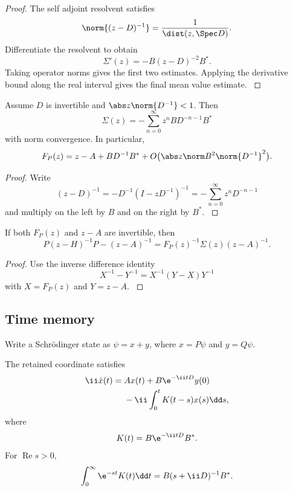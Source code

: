 \begin{proof}\label{strong:proof:047}
The self adjoint resolvent satisfies
\[
\norm{(z-D)^{-1}}=\frac1{\dist(z,\Spec D)}.
\]
Differentiate the resolvent to obtain
\[
\Sigma'(z)=-B(z-D)^{-2}B^*.
\]
Taking operator norms gives the first two estimates. Applying the derivative bound along the real interval gives the final mean value estimate.
\label{strong:proof:047:end}\end{proof}

\begin{proposition}\label{strong:proposition:005}\label{strong:prop:low_energy_expansion}
Assume \(D\) is invertible and \(\abs z\norm{D^{-1}}<1\). Then
\[
\Sigma(z)
=-
\sum_{n=0}^{\infty}
z^nBD^{-n-1}B^*
\]
with norm convergence. In particular,
\[
F_P(z)
=
 z-A+BD^{-1}B^*+O\bigl(\abs z\norm B^2\norm{D^{-1}}^2\bigr).
\]
\end{proposition}

\begin{proof}\label{strong:proof:048}
Write
\[
(z-D)^{-1}
=-D^{-1}(I-zD^{-1})^{-1}
=-\sum_{n=0}^{\infty}z^nD^{-n-1}
\]
and multiply on the left by \(B\) and on the right by \(B^*\).
\label{strong:proof:048:end}\end{proof}

\begin{proposition}\label{strong:proposition:006}\label{strong:prop:bare_truncation}
If both \(F_P(z)\) and \(z-A\) are invertible, then
\[
P(z-H)^{-1}P-(z-A)^{-1}
=
F_P(z)^{-1}\Sigma(z)(z-A)^{-1}.
\]
\end{proposition}

\begin{proof}\label{strong:proof:049}
Use the inverse difference identity
\[
X^{-1}-Y^{-1}=X^{-1}(Y-X)Y^{-1}
\]
with \(X=F_P(z)\) and \(Y=z-A\).
\label{strong:proof:049:end}\end{proof}

\subsection{Time memory}\label{strong:subsec:time_memory}

Write a Schrödinger state as \(\psi=x+y\), where \(x=P\psi\) and \(y=Q\psi\).

\begin{theorem}\label{strong:theorem:032}\label{strong:thm:memory_equation}
The retained coordinate satisfies
\[
\begin{aligned}
\ii\dot x(t)
={}&Ax(t)+B\e^{-\ii tD}y(0)\\
&-\ii\int_0^tK(t-s)x(s)\dd s,
\end{aligned}
\]
where
\[
K(t)=B\e^{-\ii tD}B^*.
\]
For \(\operatorname{Re}s>0\),
\[
\int_0^\infty\e^{-st}K(t)\dd t
=
B(s+\ii D)^{-1}B^*.
\]
\end{theorem}

